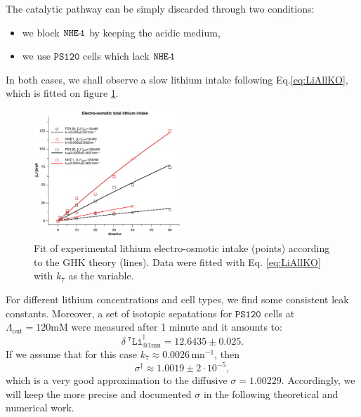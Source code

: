 \documentclass[aps,onecolumn,12pt]{revtex4}
\newcommand{\mychem}[1]{\mathtt{#1}}
\newcommand{\spLi}[1]{{~^{\mychem{#1}}\mychem{Li}}}
\newcommand{\deltaLi}{ {\delta\!\!\!\spLi{7}} }
\newcommand{\LiAll}{\Lambda}
\newcommand{\LiAllOut}{{\LiAll}_{\mathrm{out}}}
\newcommand{\NHE}[1]{\mychem{NHE}{\mychem{\hbox{-}\!#1}}}
\newcommand{\todo}[1]{\framebox{\textbf{\color{WildStrawberry}{#1}}}}
\newcommand{\ko}{\dagger}
\begin{document}
The catalytic pathway can be simply discarded through two conditions:
\begin{itemize}
	\item we block $\NHE{1}$ by keeping the acidic medium,
	\item we use   $\mychem{PS120}$ cells which lack $\NHE{1}$
\end{itemize}
In both cases, we shall observe a slow lithium intake following Eq.\eqref{eq:LiAllKO}, which is fitted on figure \ref{fig:leak}.
\begin{figure}[!ht]
\begin{center}
\includegraphics[width=0.5\textwidth]{leaks.pdf}
\end{center}
\caption{\label{fig:leak} Fit of experimental lithium electro-osmotic intake (points) according to the GHK theory (lines). Data were fitted with
Eq. \eqref{eq:LiAllKO} with $k_7$ as the variable.}
\end{figure}
For different lithium concentrations and cell types, we find some consistent leak constants.
Moreover, a set of isotopic sepatations for $\mychem{PS120}$ cells at $\LiAllOut=120\text{mM}$ were measured after 1 minute and it amounts to:
\begin{equation}
\label{eq:d7ps120}
\deltaLi^\ko_{@1\text{mn}} = 12.6435 \pm 0.025.
\end{equation}
If we assume that
for this case $k_7\approx0.0026\,\text{mn}^{-1}$, then
\begin{equation}
	\sigma^\ko \approx 1.0019 \pm 2\cdot10^{-5},
\end{equation}
which is a very good approximation \todo{given the crude assumptions} to the diffusive $\sigma=1.00229$. Accordingly, we will keep the more precise and documented $\sigma$ 
in the following theoretical and numerical work.
\end{document}
